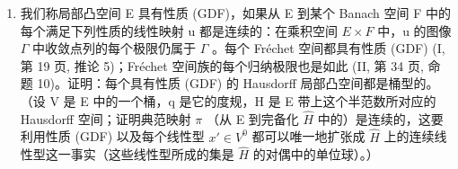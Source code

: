 \begin{enumerate}
\def\labelenumi{\arabic{enumi})}
\setcounter{enumi}{25}
\tightlist
\item
  我们称局部凸空间 E 具有性质 (GDF)，如果从 E 到某个 Banach 空间 F 中的每个满足下列性质的线性映射 u 都是连续的：在乘积空间 \(E \times F\) 中，u 的图像 \(\Gamma\) 中收敛点列的每个极限仍属于 \(\Gamma\) 。每个 Fréchet 空间都具有性质 (GDF) (I, 第 19 页, 推论 5)；Fréchet 空间族的每个归纳极限也是如此 (II, 第 34 页, 命题 10)。证明：每个具有性质 (GDF) 的 Hausdorff 局部凸空间都是桶型的。（设 V 是 E 中的一个桶，q 是它的度规，H 是 E 带上这个半范数所对应的 Hausdorff 空间；证明典范映射 \(\pi\) （从 E 到完备化 \(\hat{H}\) 中的）是连续的，这要利用性质 (GDF) 以及每个线性型 \(x' \in V^{0}\) 都可以唯一地扩张成 \(\hat{H}\) 上的连续线性型这一事实（这些线性型所成的集是 \(\hat{H}\) 的对偶中的单位球）。）
\end{enumerate}


